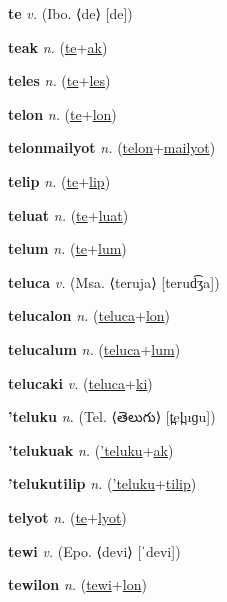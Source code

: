 \textbf{\hypertarget{te}{te}} \textit{v.} (Ibo. ⟨de⟩ [de])


\textbf{\hypertarget{teak}{teak}} \textit{n.} (\hyperlink{te}{te}+\allowbreak \hyperlink{ak}{ak})


\textbf{\hypertarget{teles}{teles}} \textit{n.} (\hyperlink{te}{te}+\allowbreak \hyperlink{les}{les})


\textbf{\hypertarget{telon}{telon}} \textit{n.} (\hyperlink{te}{te}+\allowbreak \hyperlink{lon}{lon})


\textbf{\hypertarget{telonmailyot}{telonmailyot}} \textit{n.} (\hyperlink{telon}{telon}+\allowbreak \hyperlink{mailyot}{mailyot})


\textbf{\hypertarget{telip}{telip}} \textit{n.} (\hyperlink{te}{te}+\allowbreak \hyperlink{lip}{lip})


\textbf{\hypertarget{teluat}{teluat}} \textit{n.} (\hyperlink{te}{te}+\allowbreak \hyperlink{luat}{luat})


\textbf{\hypertarget{telum}{telum}} \textit{n.} (\hyperlink{te}{te}+\allowbreak \hyperlink{lum}{lum})


\textbf{\hypertarget{teluca}{teluca}} \textit{v.} (Msa. ⟨teruja⟩ [terud͡ʒa])


\textbf{\hypertarget{telucalon}{telucalon}} \textit{n.} (\hyperlink{teluca}{teluca}+\allowbreak \hyperlink{lon}{lon})


\textbf{\hypertarget{telucalum}{telucalum}} \textit{n.} (\hyperlink{teluca}{teluca}+\allowbreak \hyperlink{lum}{lum})


\textbf{\hypertarget{telucaki}{telucaki}} \textit{v.} (\hyperlink{teluca}{teluca}+\allowbreak \hyperlink{ki}{ki})


\textbf{\hypertarget{'teluku}{'teluku}} \textit{n.} (Tel. ⟨{\telugu{}తెలుగు}⟩ [t̪el̪uɡu])


\textbf{\hypertarget{'telukuak}{'telukuak}} \textit{n.} (\hyperlink{'teluku}{'teluku}+\allowbreak \hyperlink{ak}{ak})


\textbf{\hypertarget{'telukutilip}{'telukutilip}} \textit{n.} (\hyperlink{'teluku}{'teluku}+\allowbreak \hyperlink{tilip}{tilip})


\textbf{\hypertarget{telyot}{telyot}} \textit{n.} (\hyperlink{te}{te}+\allowbreak \hyperlink{lyot}{lyot})


\textbf{\hypertarget{tewi}{tewi}} \textit{v.} (Epo. ⟨devi⟩ [ˈdevi])


\textbf{\hypertarget{tewilon}{tewilon}} \textit{n.} (\hyperlink{tewi}{tewi}+\allowbreak \hyperlink{lon}{lon})


